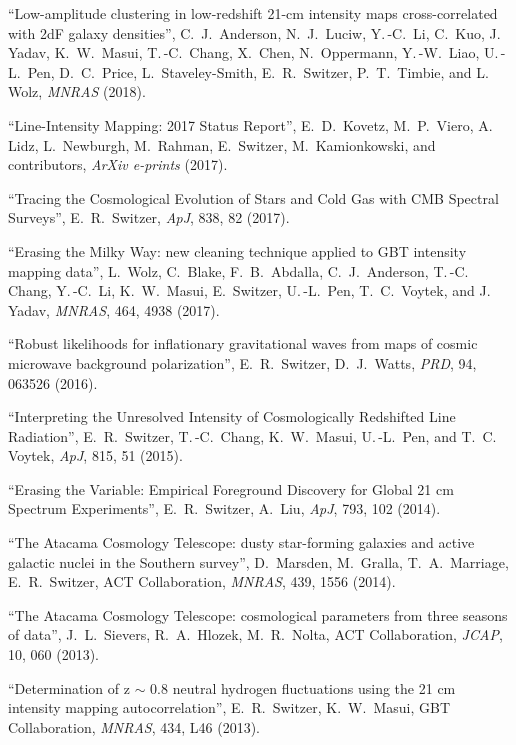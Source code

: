 \item ``Low-amplitude clustering in low-redshift 21-cm intensity maps cross-correlated with 2dF galaxy densities'', C.\, J.\, Anderson, N.\, J.\, Luciw, Y.\,-C.\, Li, C.\, Kuo, J.\, Yadav, K.\, W.\, Masui, T.\,-C.\, Chang, X.\, Chen, N.\, Oppermann, Y.\,-W.\, Liao, U.\,-L.\, Pen, D.\, C.\, Price, L.\, Staveley-Smith, E.\, R.\, Switzer, P.\, T.\, Timbie, and L.\, Wolz, {\it MNRAS} (2018).
\item ``Line-Intensity Mapping: 2017 Status Report'', E.\, D.\, Kovetz, M.\, P.\, Viero, A.\, Lidz, L.\, Newburgh, M.\, Rahman, E.\, Switzer, M.\, Kamionkowski, and contributors, {\it ArXiv e-prints} (2017).
\item ``Tracing the Cosmological Evolution of Stars and Cold Gas with CMB Spectral Surveys'', E.\, R.\, Switzer, {\it ApJ}, 838, 82 (2017).
\item ``Erasing the Milky Way: new cleaning technique applied to GBT intensity mapping data'', L.\, Wolz, C.\, Blake, F.\, B.\, Abdalla, C.\, J.\, Anderson, T.\,-C.\, Chang, Y.\,-C.\, Li, K.\, W.\, Masui, E.\, Switzer, U.\,-L.\, Pen, T.\, C.\, Voytek, and J.\, Yadav, {\it MNRAS}, 464, 4938 (2017).
\item ``Robust likelihoods for inflationary gravitational waves from maps of cosmic microwave background polarization'', E.\, R.\, Switzer, D.\, J.\, Watts, {\it PRD}, 94, 063526 (2016).
\item ``Interpreting the Unresolved Intensity of Cosmologically Redshifted Line Radiation'', E.\, R.\, Switzer, T.\,-C.\, Chang, K.\, W.\, Masui, U.\,-L.\, Pen, and T.\, C.\, Voytek, {\it ApJ}, 815, 51 (2015).
\item ``Erasing the Variable: Empirical Foreground Discovery for Global 21 cm Spectrum Experiments'', E.\, R.\, Switzer, A.\, Liu, {\it ApJ}, 793, 102 (2014).
\item ``The Atacama Cosmology Telescope: dusty star-forming galaxies and active galactic nuclei in the Southern survey'', D.\, Marsden, M.\, Gralla, T.\, A.\, Marriage, E.\, R.\, Switzer, ACT Collaboration, {\it MNRAS}, 439, 1556 (2014).
\item ``The Atacama Cosmology Telescope: cosmological parameters from three seasons of data'', J.\, L.\, Sievers, R.\, A.\, Hlozek, M.\, R.\, Nolta, ACT Collaboration, {\it JCAP}, 10, 060 (2013).
\item ``Determination of z $\sim$ 0.8 neutral hydrogen fluctuations using the 21 cm intensity mapping autocorrelation'', E.\, R.\, Switzer, K.\, W.\, Masui, GBT Collaboration, {\it MNRAS}, 434, L46 (2013).
